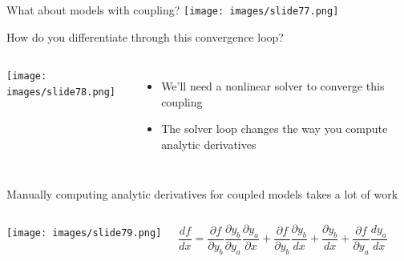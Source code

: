 \documentclass[aspectratio=169, usenames,dvipsnames, 14pt]{beamer}
\begin{document}

 \begin{frame}{What about models with coupling?}
 \centering
 \texttt{[image: images/slide77.png]}
 
 \end{frame}


 \begin{frame}{How do you differentiate through this convergence loop? }
 \begin{columns}
         \texttt{[image: images/slide78.png]}
 
         \begin{itemize}
             \item We'll need a nonlinear solver to converge this coupling
             \vspace{0.5cm}
             \item The solver loop changes the way you compute analytic derivatives
         \end{itemize}
 \end{columns}
 
 \end{frame}

 \begin{frame}{Manually computing analytic derivatives for coupled models takes a lot of work}
 \begin{columns}
         \texttt{[image: images/slide79.png]}
 
 
        \begin{equation*}
             \frac{df}{dx} = \frac{\partial f}{\partial y_{b}} \frac{\partial y_{b}}{\partial y_{a}} \frac{\partial y_{a}}{\partial x} + \frac{\partial f}{\partial y_{b}} \frac{\partial y_{b}}{dx} + \frac{\partial y_{b}}{dx} + \frac{\partial f}{\partial y_{a}} \frac{dy_{a}}{dx}
         \end{equation*}
 \end{columns}
 
 \end{frame}
\end{document}
